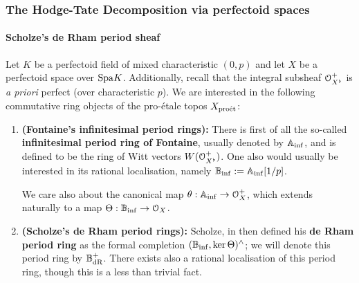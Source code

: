            \subsubsection{The Hodge-Tate Decomposition via perfectoid spaces}
                \paragraph{Scholze's de Rham period sheaf}
                    \begin{definition} \label{def: de_rham_period_sheaves}
                        Let $K$ be a perfectoid field of mixed characteristic $(0, p)$ and let $X$ be a perfectoid space over $\mathrm{Spa} K$. Additionally, recall that the integral subsheaf $\mathcal{O}_{X^{\flat}}^+$ is \textit{a priori} perfect (over characteristic $p$). We are interested in the following commutative ring objects of the pro-\'etale topos $X_{\mathrm{pro\acute{e}t}}$:
                            \begin{enumerate}
                                \item \textbf{(Fontaine's infinitesimal period rings):} There is first of all the so-called \textbf{infinitesimal period ring of Fontaine}, usually denoted by $\mathbb{A}_{\inf}$, and is defined to be the ring of Witt vectors $W(\mathcal{O}_{X^{\flat}}^+)$. One also would usually be interested in its rational localisation, namely $\mathbb{B}_{\inf} := \mathbb{A}_{\inf}[1/p]$. 
                                
                                We care also about the canonical map $\theta: \mathbb{A}_{\inf} \to \mathcal{O}_X^+$, which extends naturally to a map $\Theta: \mathbb{B}_{\inf} \to \mathcal{O}_X$.
                                \item \textbf{(Scholze's de Rham period rings):} Scholze, in \cite[Definition 6.1]{scholze2012padic} then defined his \textbf{de Rham period ring} as the formal completion $(\mathbb{B}_{\inf}, \ker \Theta)^{\wedge}$; we will denote this period ring by $\mathbb{B}_{\mathrm{dR}}^+$. There exists also a rational localisation of this period ring, though this is a less than trivial fact.
                            \end{enumerate}
                    \end{definition}
                    
